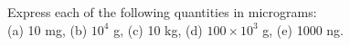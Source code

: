 Express each of the following quantities in micrograms:\\
(a) 10 mg, (b) $10^4$ g, (c) 10 kg, (d) $100\times10^3$ g, (e) 1000 ng. \answercheck\hwendpart
